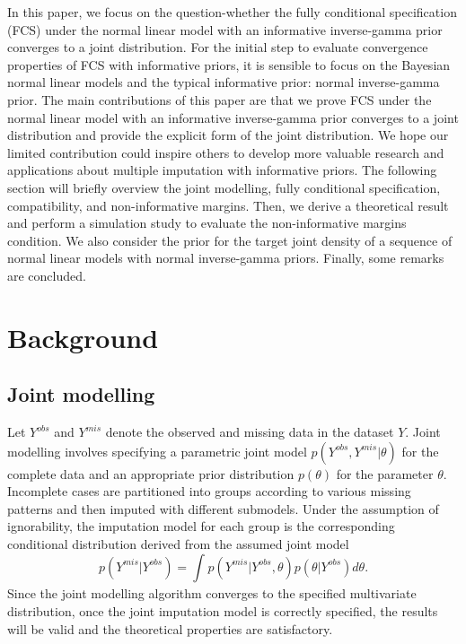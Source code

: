 In this paper, we focus on the question-whether the fully conditional specification (FCS) under the normal linear model with an informative inverse-gamma prior converges to a joint distribution. For the initial step to evaluate convergence properties of FCS with informative priors, it is sensible to focus on the Bayesian normal linear models and the typical informative prior: normal inverse-gamma prior. The main contributions of this paper are that we prove FCS under the normal linear model with an informative inverse-gamma prior converges to a joint distribution and provide the explicit form of the joint distribution. We hope our limited contribution could inspire others to develop more valuable research and applications about multiple imputation with informative priors. The following section will briefly overview the joint modelling, fully conditional specification, compatibility, and non-informative margins. Then, we derive a theoretical result and perform a simulation study to evaluate the non-informative margins condition. We also consider the prior for the target joint density of a sequence of normal linear models with normal inverse-gamma priors. Finally, some remarks are concluded.
	
	\section{Background}
	\subsection{Joint modelling}
	Let $Y^{obs}$ and $Y^{mis}$ denote the observed and missing data in the dataset $Y$. Joint modelling involves specifying a parametric joint model $p(Y^{obs}, Y^{mis}|\theta)$ for the complete data and an appropriate prior distribution $p(\theta)$ for the parameter $\theta$. Incomplete cases are partitioned into groups according to various missing patterns and then imputed with different submodels. Under the assumption of ignorability, the imputation model for each group is the corresponding conditional distribution derived from the assumed joint model 
	\begin{equation*}
		p(Y^{mis}|Y^{obs}) = \int_{}p(Y^{mis}| Y^{obs}, \theta)p(\theta|Y^{obs})d\theta.
	\end{equation*}
	Since the joint modelling algorithm converges to the specified multivariate distribution, once the joint imputation model is correctly specified, the results will be valid and the theoretical properties are satisfactory. 
